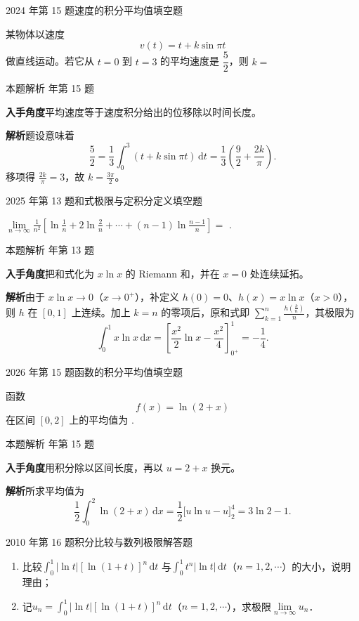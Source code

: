 \documentclass[UTF8,zihao=-4,fontset=fandol]{ctexart}
\renewcommand{\lim}{\operatorname*{lim}\limits}
\newcommand{\blank}{\underline{\hspace{5em}}}
\newcommand{\QuestionPage}[6]{%
  \par\noindent\begin{minipage}{\linewidth}
  \raggedright
  {\small\textcolor{black!60}{#3\quad #5}\hfill\textcolor{accent}{#2}}\par\smallskip}
\newcommand{\QuestionEnd}{\end{minipage}\par\medskip}
\newcommand{\QuestionPage}[6]{%
  \clearpage
  {\small\textcolor{accent}{#1\hfill #2}}\par\medskip
  {\small\textcolor{black!60}{#3\quad #5\hfill #6}}\par\vspace{9bp}}
\newcommand{\QuestionEnd}{}
\newenvironment{QuestionSolution}[1]{%
  \clearpage
  {\small\textcolor{black!60}{本题解析\quad #1}}\par\medskip
}{\par\clearpage}
\begin{document}
\QuestionPage{3.1 定积分的概念、存在条件与性质}{填空题}{2024 年第 15 题}{2}{速度的积分平均值}{135 / 234}
某物体以速度
\[v(t)=t+k\sin\pi t
\]
做直线运动。若它从 \(t=0\) 到 \(t=3\) 的平均速度是 \(\dfrac52\)，则 \(k=\) \blank{}
\QuestionEnd

\begin{QuestionSolution}{2024 年第 15 题}
\textbf{入手角度}\quad 平均速度等于速度积分给出的位移除以时间长度。

\textbf{解析}\quad 题设意味着
\[
\frac52=\frac13\int_0^3(t+k\sin\pi t)\,\mathrm{d}t
=\frac13\left(\frac92+\frac{2k}{\pi}\right).
\]
移项得 \(\frac{2k}{\pi}=3\)，故 \(k=\boxed{\frac{3\pi}{2}}\)。
\end{QuestionSolution}

\QuestionPage{3.1 定积分的概念、存在条件与性质}{填空题}{2025 年第 13 题}{2}{和式极限与定积分定义}{136 / 234}
\(\lim_{n \to \infty} \frac{1}{n^{2}} \left[ \ln \frac{1}{n} + 2 \ln \frac{2}{n} + \cdots + \left( n - 1 \right) \ln \frac{n - 1}{n} \right] =\) \blank{}.
\QuestionEnd

\begin{QuestionSolution}{2025 年第 13 题}
\textbf{入手角度}\quad 把和式化为 \(x\ln x\) 的 Riemann 和，并在 \(x=0\) 处连续延拓。

\textbf{解析}\quad 由于 \(x\ln x\to0\)（\(x\to0^+\)），补定义 \(h(0)=0\)、\(h(x)=x\ln x\)（\(x>0\)），则 \(h\) 在 \([0,1]\) 上连续。加上 \(k=n\) 的零项后，原和式即 \(\sum_{k=1}^n \frac{h(\frac{k}{n})}{n}\)，其极限为
\[
\int_0^1 x\ln x\,\mathrm{d}x
=\left[\frac{x^2}{2}\ln x-\frac{x^2}{4}\right]_{0^+}^1
=\boxed{-\frac14}.
\]
\end{QuestionSolution}

\QuestionPage{3.1 定积分的概念、存在条件与性质}{填空题}{2026 年第 15 题}{2}{函数的积分平均值}{137 / 234}
函数
\[f(x)=\ln(2+x)
\]
在区间 \([0,2]\) 上的平均值为 \blank{}.
\QuestionEnd

\begin{QuestionSolution}{2026 年第 15 题}
\textbf{入手角度}\quad 用积分除以区间长度，再以 \(u=2+x\) 换元。

\textbf{解析}\quad 所求平均值为
\[
\frac12\int_0^2\ln(2+x)\,\mathrm{d}x
=\frac12\bigl[u\ln u-u\bigr]_2^4
=\boxed{3\ln2-1}.
\]
\end{QuestionSolution}

\QuestionPage{3.1 定积分的概念、存在条件与性质}{解答题}{2010 年第 16 题}{2}{积分比较与数列极限}{138 / 234}
\begin{enumerate}
\item
比较$\int_0^1 |\ln t|[\ln(1+t)]^n\,\mathrm{d} t$
与$\int_0^1 t^n |\ln t|\,\mathrm{d} t$（$n=1,2,\cdots$）的大小，说明理由；
\item
记$u_n = \int_0^1 |\ln t|[\ln(1+t)]^n\,\mathrm{d} t$（$n=1,2,\cdots$），求极限$\lim_{n\to\infty} u_n$．
\end{enumerate}
\QuestionEnd
\end{document}
